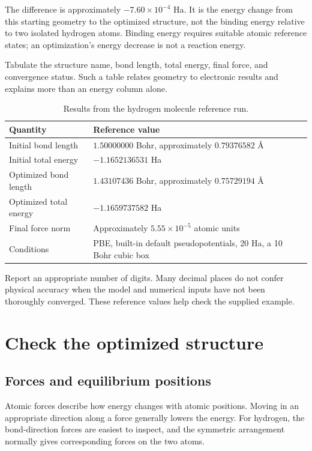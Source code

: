 The difference is approximately $-7.60\times10^{-4}$ Ha. It is the energy change from this starting geometry to the optimized structure, not the binding energy relative to two isolated hydrogen atoms. Binding energy requires suitable atomic reference states; an optimization's energy decrease is not a reaction energy.

Tabulate the structure name, bond length, total energy, final force, and convergence status. Such a table relates geometry to electronic results and explains more than an energy column alone.

\begin{table}[htbp]
\centering
\caption{Results from the hydrogen molecule reference run.}
\begin{tabularx}{\linewidth}{lX}
\toprule
Quantity & Reference value\\
\midrule
Initial bond length & $1.50000000$ Bohr, approximately $0.79376582$ Å\\
Initial total energy & $-1.1652136531$ Ha\\
Optimized bond length & $1.43107436$ Bohr, approximately $0.75729194$ Å\\
Optimized total energy & $-1.1659737582$ Ha\\
Final force norm & Approximately $5.55\times10^{-5}$ atomic units\\
Conditions & PBE, built-in default pseudopotentials, 20 Ha, a 10 Bohr cubic box\\
\bottomrule
\end{tabularx}
\end{table}

Report an appropriate number of digits. Many decimal places do not confer physical accuracy when the model and numerical inputs have not been thoroughly converged. These reference values help check the supplied example.

\section{Check the optimized structure}

\subsection{Forces and equilibrium positions}

Atomic forces describe how energy changes with atomic positions. Moving in an appropriate direction along a force generally lowers the energy. For hydrogen, the bond-direction forces are easiest to inspect, and the symmetric arrangement normally gives corresponding forces on the two atoms.

